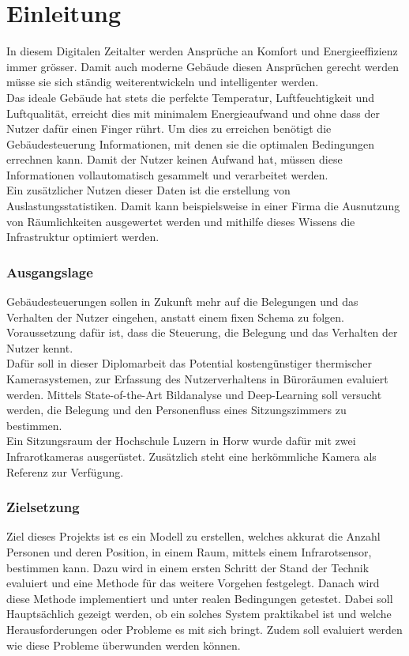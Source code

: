 \chapter{Einleitung}

In diesem Digitalen Zeitalter werden Ansprüche an Komfort und Energieeffizienz immer grösser. Damit auch moderne Gebäude diesen Ansprüchen gerecht werden müsse sie sich ständig weiterentwickeln und intelligenter werden.\\
Das ideale Gebäude hat stets die perfekte Temperatur, Luftfeuchtigkeit und Luftqualität, erreicht dies mit minimalem Energieaufwand und ohne dass der Nutzer dafür einen Finger rührt. Um dies zu erreichen benötigt die Gebäudesteuerung Informationen, mit denen sie die optimalen Bedingungen errechnen kann. Damit der Nutzer keinen Aufwand hat, müssen diese Informationen vollautomatisch gesammelt und verarbeitet werden.\\
Ein zusätzlicher Nutzen dieser Daten ist die erstellung von Auslastungsstatistiken. Damit kann beispielsweise in einer Firma die Ausnutzung von Räumlichkeiten ausgewertet werden und mithilfe dieses Wissens die Infrastruktur optimiert werden.

\subsection{Ausgangslage}
\label{sec:Ausgangslage}

Gebäudesteuerungen sollen in Zukunft mehr auf die Belegungen und das Verhalten der Nutzer eingehen, anstatt einem fixen Schema zu folgen. Voraussetzung dafür ist, dass die Steuerung, die Belegung und das Verhalten der Nutzer kennt.\\
Dafür soll in dieser Diplomarbeit das Potential kostengünstiger thermischer Kamerasystemen, zur Erfassung des Nutzerverhaltens in Büroräumen evaluiert werden. Mittels State-of-the-Art Bildanalyse und Deep-Learning soll versucht werden, die Belegung und den Personenfluss eines Sitzungszimmers zu bestimmen.\\
Ein Sitzungsraum der Hochschule Luzern in Horw wurde dafür mit zwei Infrarotkameras ausgerüstet. Zusätzlich steht eine herkömmliche Kamera als Referenz zur Verfügung.


\subsection{Zielsetzung}
\label{sec:Zielsetzung}

Ziel dieses Projekts ist es ein Modell zu erstellen, welches akkurat die Anzahl Personen und deren Position, in einem Raum, mittels einem Infrarotsensor, bestimmen kann. Dazu wird in einem ersten Schritt der Stand der Technik evaluiert und eine Methode für das weitere Vorgehen festgelegt. Danach wird diese Methode implementiert und unter realen Bedingungen getestet. Dabei soll Hauptsächlich gezeigt werden, ob ein solches System praktikabel ist und welche Herausforderungen oder Probleme es mit sich bringt. Zudem soll evaluiert werden wie diese Probleme überwunden werden können.

